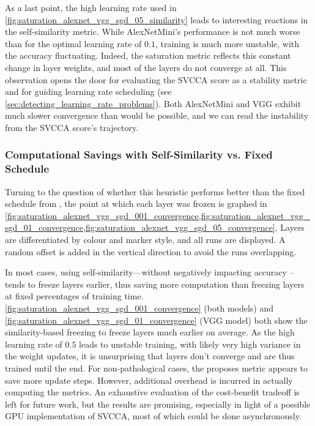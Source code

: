 As a last point, the high learning rate used in
\cref{fig:saturation_alexnet_vgg_sgd_05_similarity} leads to interesting reactions in the
self-similarity metric. While AlexNetMini's performance is not much worse than
for the optimal learning rate of $0.1$, training is much more unstable, with the
accuracy fluctuating. Indeed, the saturation metric reflects this constant
change in layer weights, and most of the layers do not converge at all. This
observation opens the door for evaluating the SVCCA score as a stability metric
and for guiding learning rate scheduling (see
\cref{sec:detecting_learning_rate_problems}). Both AlexNetMini and VGG exhibit
much slower convergence than would be possible, and we can read the instability
from the SVCCA score's trajectory.

\subsubsection{Computational Savings with Self-Similarity vs. Fixed Schedule}

Turning to the question of whether this heuristic performs better than the fixed
schedule from \citep{raghu2017svcca}, the point at which each layer was frozen
is graphed in
\cref{fig:saturation_alexnet_vgg_sgd_001_convergence,fig:saturation_alexnet_vgg_sgd_01_convergence,fig:saturation_alexnet_vgg_sgd_05_convergence}.
Layers are differentiated by colour and marker style, and all runs are
displayed. A random offset is added in the vertical direction to avoid the runs
overlapping.

In most cases, using self-similarity---without negatively impacting accuracy --
tends to freeze layers earlier, thus saving more computation than freezing
layers at fixed percentages of training time.
\cref{fig:saturation_alexnet_vgg_sgd_001_convergence} (both models) and
\cref{fig:saturation_alexnet_vgg_sgd_01_convergence} (VGG model) both show the
similarity-based freezing to freeze layers much earlier on average. As the high
learning rate of $0.5$ leads to unstable training, with likely very high
variance in the weight updates, it is unsurprising that layers don't converge
and are thus trained until the end. For non-pathological cases, the proposes
metric appears to save more update steps. However, additional overhead is
incurred in actually computing the metrics. An exhaustive evaluation of the
cost-benefit tradeoff is left for future work, but the results are promising,
especially in light of a possible GPU implementation of SVCCA, most of which
could be done asynchronously.

